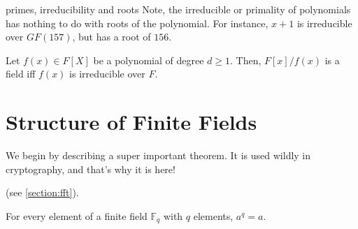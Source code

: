 \begin{notice}{primes, irreducibility and roots}
Note, the irreducible or primality of polynomials has nothing to do with roots 
of the polynomial. For instance, $x+1$ is irreducible over $GF(157)$, but has 
a root of $156$.
\end{notice}

\begin{theorem}
    Let $f(x)\in F[X]$ be a polynomial of degree $d\ge 1$.
    Then, $F[x]/f(x)$ is a field iff $f(x)$ is irreducible over $F$.
\end{theorem}


\section{Structure of Finite Fields}
We begin by describing a super important theorem. It is used wildly in cryptography, and that's why it is here! 


(see \autoref{section:fft}). 
\begin{theorem}\label{fermats-little-theorem}
    For every element of a finite field $\mathbb{F}_q$ with $q$ elements, 
    $a^q=a$. 
\end{theorem}

